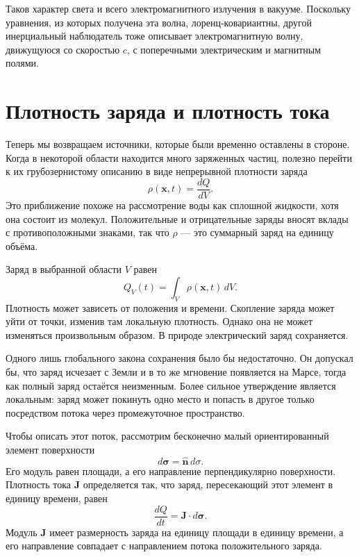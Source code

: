 Таков характер света и всего электромагнитного излучения в вакууме. Поскольку уравнения, из которых получена эта волна, лоренц-ковариантны, другой инерциальный наблюдатель тоже описывает электромагнитную волну, движущуюся со скоростью \(c\), с поперечными электрическим и магнитным полями.

\section{Плотность заряда и плотность тока}

Теперь мы возвращаем источники, которые были временно оставлены в стороне. Когда в некоторой области находится много заряженных частиц, полезно перейти к их грубозернистому описанию в виде непрерывной плотности заряда
\begin{equation}
\rho(\mathbf x,t)=\frac{dQ}{dV}.
\end{equation}
Это приближение похоже на рассмотрение воды как сплошной жидкости, хотя она состоит из молекул. Положительные и отрицательные заряды вносят вклады с противоположными знаками, так что \(\rho\) — это суммарный заряд на единицу объёма.

Заряд в выбранной области \(V\) равен
\begin{equation}
Q_V(t)=\int_V\rho(\mathbf x,t)\,dV.
\label{eq:charge-volume}
\end{equation}
Плотность может зависеть от положения и времени. Скопление заряда может уйти от точки, изменив там локальную плотность. Однако она не может изменяться произвольным образом. В природе электрический заряд сохраняется.

Одного лишь глобального закона сохранения было бы недостаточно. Он допускал бы, что заряд исчезает с Земли и в то же мгновение появляется на Марсе, тогда как полный заряд остаётся неизменным. Более сильное утверждение является локальным: заряд может покинуть одно место и попасть в другое только посредством потока через промежуточное пространство.

Чтобы описать этот поток, рассмотрим бесконечно малый ориентированный элемент поверхности
\begin{equation}
d\boldsymbol\sigma=\widehat{\mathbf n}\,d\sigma.
\end{equation}
Его модуль равен площади, а его направление перпендикулярно поверхности. Плотность тока \(\mathbf J\) определяется так, что заряд, пересекающий этот элемент в единицу времени, равен
\begin{equation}
\frac{dQ}{dt}=\mathbf J\cdot d\boldsymbol\sigma.
\label{eq:current-flux-element}
\end{equation}
Модуль \(\mathbf J\) имеет размерность заряда на единицу площади в единицу времени, а его направление совпадает с направлением потока положительного заряда.

